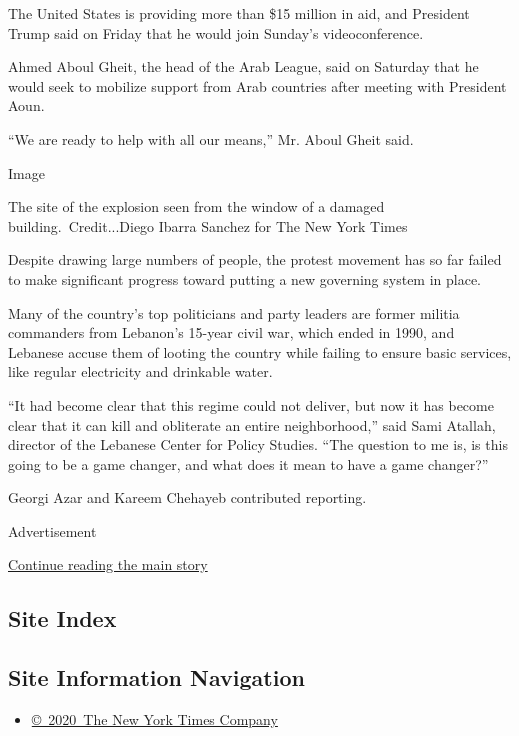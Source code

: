The United States is providing more than \$15 million in aid, and
President Trump said on Friday that he would join Sunday's
videoconference.

Ahmed Aboul Gheit, the head of the Arab League, said on Saturday that he
would seek to mobilize support from Arab countries after meeting with
President Aoun.

``We are ready to help with all our means,'' Mr. Aboul Gheit said.

Image

The site of the explosion seen from the window of a damaged
building.~Credit...Diego Ibarra Sanchez for The New York Times

Despite drawing large numbers of people, the protest movement has so far
failed to make significant progress toward putting a new governing
system in place.

Many of the country's top politicians and party leaders are former
militia commanders from Lebanon's 15-year civil war, which ended in
1990, and Lebanese accuse them of looting the country while failing to
ensure basic services, like regular electricity and drinkable water.

``It had become clear that this regime could not deliver, but now it has
become clear that it can kill and obliterate an entire neighborhood,''
said Sami Atallah, director of the Lebanese Center for Policy Studies.
``The question to me is, is this going to be a game changer, and what
does it mean to have a game changer?''

Georgi Azar and Kareem Chehayeb contributed reporting.

Advertisement

\protect\hyperlink{after-bottom}{Continue reading the main story}

\hypertarget{site-index}{%
\subsection{Site Index}\label{site-index}}

\hypertarget{site-information-navigation}{%
\subsection{Site Information
Navigation}\label{site-information-navigation}}

\begin{itemize}
\tightlist
\item
  \href{https://help.nytimes.com/hc/en-us/articles/115014792127-Copyright-notice}{©~2020~The
  New York Times Company}
\end{itemize}

